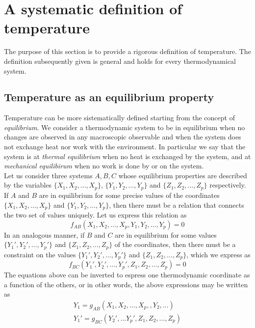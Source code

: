 \chapter{A systematic definition of temperature}
\label{ch:temperature}

The purpose of this section is to provide a rigorous definition of temperature. The definition subsequently given is general and holds for every thermodynamical system.
\section{Temperature as an equilibrium property}
Temperature can be more sistematically defined starting from the concept of \emph{equilibrium}. We consider a thermodynamic system to be in equilibrium when 
no changes are observed in any macroscopic observable and when the system does not exchange heat nor work with the environment. In particular we say that the system is at \emph{thermal equilibrium} when no heat is exchanged by the system, and
at \emph{mechanical equilibirum} when no work is done by or on the system. \\
Let us consider three systems $A, B, C$ whose equilibrium properties are described by the variables
$\{X_1, X_2, \dots, X_p\}$, $\{Y_1, Y_2, \dots, Y_p\}$ and $\{Z_1, Z_2, \dots, Z_p\}$ respectively. \\
If $A$ and $B$ are in equilibrium for some precise values of the coordinates $\{X_1, X_2, \dots, X_p\}$ and $\{Y_1, Y_2, \dots, Y_p\}$, then there must be a relation that connects the two set of values uniquely. Let us express this relation as
\begin{equation}
    f_{AB}(X_1, X_2, \dots, X_p, Y_1, Y_2, \dots, Y_p) = 0
    \label{eq:constrain1}
\end{equation}
In an analogous manner, if $B$ and $C$ are in equilibrium for some values $\{Y_1', Y_2', \dots, Y_p'\}$ and $\{Z_1, Z_2, \dots, Z_p\}$ of the coordinates, then there must be a constraint on the values $\{Y_1', Y_2', \dots, Y_p'\}$ and $\{Z_1, Z_2, \dots, Z_p\}$, which we express as
\begin{equation}
    f_{BC}(Y_1', Y_2', \dots, Y_p', Z_1, Z_2, \dots, Z_p) = 0
    \label{eq:constrain2}
\end{equation}
The equations above can be inverted to espress one thermodynamic coordinate as a function of the others, or in other words, the above expressions may be written as
\begin{gather*}
    Y_1 = g_{AB} (X_1, X_2, \dots, X_p, , Y_2, \dots) \\
    Y_1' = g_{BC} (Y_2', \dots Y_p', Z_1, Z_2, \dots, Z_p)
\end{gather*}
